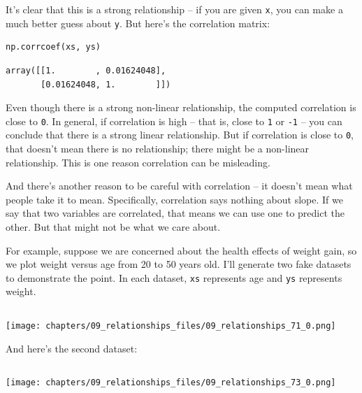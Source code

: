 It's clear that this is a strong relationship -- if you are given
\passthrough{\lstinline!x!}, you can make a much better guess about
\passthrough{\lstinline!y!}. But here's the correlation matrix:

\begin{lstlisting}[language=Python,style=source]
np.corrcoef(xs, ys)
\end{lstlisting}

\begin{lstlisting}[style=output]
array([[1.        , 0.01624048],
       [0.01624048, 1.        ]])
\end{lstlisting}

Even though there is a strong non-linear relationship, the computed
correlation is close to \passthrough{\lstinline!0!}. In general, if
correlation is high -- that is, close to \passthrough{\lstinline!1!} or
\passthrough{\lstinline!-1!} -- you can conclude that there is a strong
linear relationship. But if correlation is close to
\passthrough{\lstinline!0!}, that doesn't mean there is no relationship;
there might be a non-linear relationship. This is one reason correlation
can be misleading.

And there's another reason to be careful with correlation -- it doesn't
mean what people take it to mean. Specifically, correlation says nothing
about slope. If we say that two variables are correlated, that means we
can use one to predict the other. But that might not be what we care
about.

For example, suppose we are concerned about the health effects of weight
gain, so we plot weight versus age from 20 to 50 years old. I'll
generate two fake datasets to demonstrate the point. In each dataset,
\passthrough{\lstinline!xs!} represents age and
\passthrough{\lstinline!ys!} represents weight.

\begin{lstlisting}[language=Python,style=source]
\end{lstlisting}

\begin{center}
\texttt{[image: chapters/09\_relationships\_files/09\_relationships\_71\_0.png]}
\end{center}

And here's the second dataset:

\begin{lstlisting}[language=Python,style=source]
\end{lstlisting}

\begin{center}
\texttt{[image: chapters/09\_relationships\_files/09\_relationships\_73\_0.png]}
\end{center}

